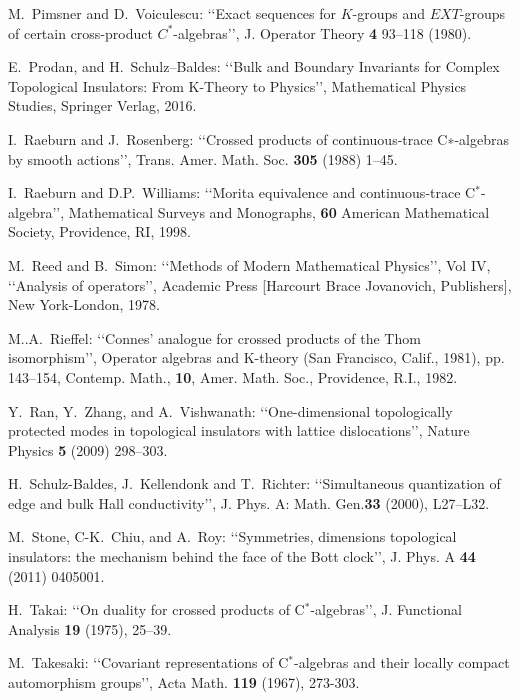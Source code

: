 \documentclass[11pt]{article}
\begin{document}
\begin{thebibliography}{99}
M.\ Pimsner and D.\  Voiculescu: \lq\lq Exact sequences for $K$-groups and $EXT$-groups of certain cross-product $C^*$-algebras\rq\rq, J. Operator Theory {\bf 4} 93--118 (1980).

E.\ Prodan, and H.\ Schulz--Baldes: \lq\lq Bulk and Boundary Invariants for Complex Topological Insulators: From K-Theory to Physics\rq\rq,
Mathematical Physics Studies,  Springer Verlag, 2016. 

I.\ Raeburn and  J.\ Rosenberg: \lq\lq Crossed products of continuous-trace C∗-algebras by smooth actions\rq\rq, Trans. Amer. Math. Soc. {\bf 305} (1988) 1--45.

I.\ Raeburn and D.P.\  Williams: 
\lq\lq Morita equivalence and continuous-trace C$^*$-algebra\rq\rq, Mathematical Surveys and Monographs, {\bf 60} American Mathematical Society, Providence, RI, 1998.

M.\  Reed and B.\  Simon:  \lq\lq Methods of Modern Mathematical Physics\rq\rq, Vol IV,  \lq\lq Analysis of operators\rq\rq, Academic Press [Harcourt Brace Jovanovich, Publishers], New York-London, 1978.

M..A.\ Rieffel: \lq\lq Connes' analogue for crossed products of the Thom isomorphism\rq\rq, Operator algebras and K-theory (San Francisco, Calif., 1981), pp. 143–154, Contemp. Math., {\bf 10}, Amer. Math. Soc., Providence, R.I., 1982. 

Y.\  Ran, Y.\  Zhang, and A.\  Vishwanath: \lq\lq One-dimensional topologically protected modes in topological insulators with lattice dislocations\rq\rq, 
Nature Physics {\bf 5} (2009) 298--303.

H.\  Schulz-Baldes, J.\  Kellendonk and T.\  Richter: \lq\lq Simultaneous quantization of edge and bulk Hall conductivity\rq\rq,
J. Phys. A: Math. Gen.{\bf 33}  (2000), L27–L32. 

M.\  Stone, C-K.\  Chiu, and A.\ Roy: \lq\lq Symmetries, dimensions topological insulators: the mechanism behind the face of the Bott clock\rq\rq, 
J. Phys. A {\bf 44} (2011) 0405001.

H.\ Takai: \lq\lq On duality for crossed products of C$^*$-algebras\rq\rq, J. Functional Analysis {\bf 19} (1975), 25--39.

M.\ Takesaki: \lq\lq Covariant representations of C$^*$-algebras and their locally compact automorphism groups\rq\rq,
Acta Math. {\bf 119} (1967), 273-303.


\end{thebibliography}
\end{document}
